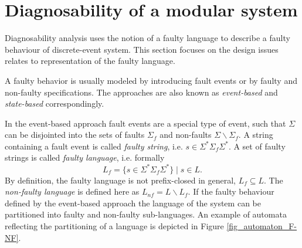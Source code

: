\documentclass[a4paper, 10pt, conference]{ieeeconf} \IEEEoverridecommandlockouts
\begin{document}
% 
% 


\section{Diagnosability of a modular system}
\label{sec:Diagnosability}
Diagnosability analysis uses the notion of a faulty language to describe a
faulty behaviour of discrete-event system. This section focuses on the
design issues relates to representation of the faulty language.  

A faulty behavior is usually modeled by introducing fault events or by faulty
and non-faulty specifications. The approaches are also known as
\emph{event-based} and \emph{state-based} correspondingly. 

In the event-based approach fault events are a special type of event, such
that $\Sigma$ can be disjointed into the sets of faults $\Sigma_f$ and
non-faults $\Sigma\backslash \Sigma_f$. A string containing a fault event is
called \emph{faulty string}, i.e. $s \in \Sigma^*\Sigma_f\Sigma^*$. A set of faulty
strings is called \emph{faulty language}, i.e. formally $$L_f = \{ s \in
\Sigma^*\Sigma_f\Sigma^* \} \mid s \in L.$$
By definition, the faulty language is not prefix-closed in general, $L_f
\subseteq L$. The \emph{non-faulty language} is defined here as $L_{nf} = L
\backslash L_f$.
If the faulty behaviour defined by the event-based approach the language of the
system can be partitioned into faulty and non-faulty sub-languages. An example
of automata reflecting the partitioning of a language is depicted in Figure
\ref{fig_automaton_F-NF}.
\end{document}
